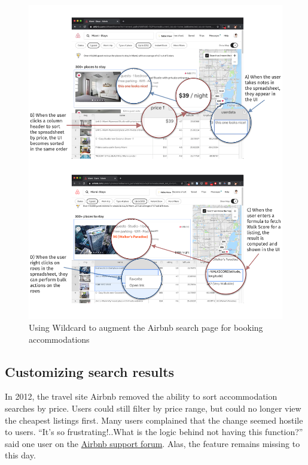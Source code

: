 \documentclass[english,submission]{programming}
\begin{document}
\begin{figure}
\hypertarget{fig:airbnb-demo}{%
\centering
\includegraphics{media/airbnb-demo-300dpi.png}
\caption{Using Wildcard to augment the Airbnb search page for booking
accommodations}\label{fig:airbnb-demo}
}
\end{figure}

\hypertarget{customizing-search-results}{%
\subsection{Customizing search
results}\label{customizing-search-results}}

In 2012, the travel site Airbnb removed the ability to sort
accommodation searches by price. Users could still filter by price
range, but could no longer view the cheapest listings first. Many users
complained that the change seemed hostile to users. ``It's so
frustrating!..What is the logic behind not having this function?'' said
one user on the
\href{https://community.withairbnb.com/t5/Hosting/Sorting-listing-by-price/td-p/559404}{Airbnb
support forum}. Alas, the feature remains missing to this day.
\end{document}
